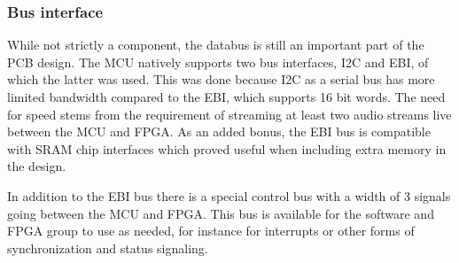 \subsubsection{Bus interface}

While not strictly a component, the databus is still an important part of the
PCB design. The MCU natively supports two bus interfaces, I2C and EBI, of which
the latter was used. This was done because I2C as a serial bus has more limited
bandwidth compared to the EBI, which supports 16 bit words. The need for speed
stems from the requirement of streaming at least two audio streams live between
the MCU and FPGA. As an added bonus, the EBI bus is compatible with SRAM chip
interfaces which proved useful when including extra memory in the design.

In addition to the EBI bus there is a special control bus with a width of 3
signals going between the MCU and FPGA. This bus is available for the software
and FPGA group to use as needed, for instance for interrupts or other forms of
synchronization and status signaling.
